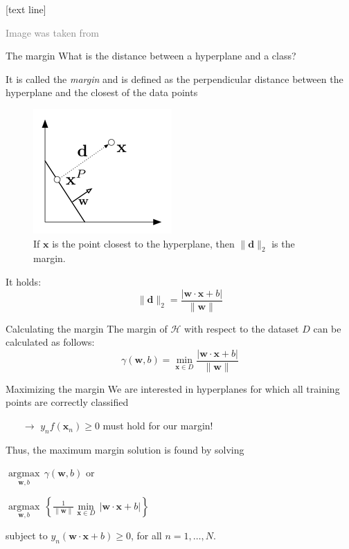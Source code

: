 \documentclass[dvipsnames]{beamer}
\DeclareMathOperator*{\argmax}{argmax}
\newcommand{\referencefootnote}[1]{\setbeamertemplate{footline}[text line]{%
\parbox{0.9\paperwidth}{\vspace*{-23pt}\tiny{\textcolor{gray}{#1}}\hfill\scriptsize\insertframenumber}}}
\begin{document}
{ \referencefootnote{Image was taken from \cite{deisenroth_faisal_ong_2020}}
    \begin{frame}{The margin}
				What is the distance between a hyperplane and a class?
				
				It is called the \emph{margin} and is defined as the perpendicular distance between the hyperplane and the closest of the data points
				\begin{figure}
					\center
					\includegraphics[scale=.6]{figures/margin6.png}
					\caption{If $\mathbf{x}$ is the point closest to the hyperplane, then $\|\mathbf{d}\|_2$ is the margin.}
        \end{figure} \pause
				It holds:
				\[
				\|\mathbf{d}\|_2 = \frac{|\mathbf{w} \cdot \mathbf{x} + b|}{\|\mathbf{w}\|}
				\]
    \end{frame}
		}
		
		 \begin{frame}{Calculating the margin}
				The margin of $\mathcal{H}$ with respect to the dataset $D$ can be calculated as follows:
				\[
						\gamma(\mathbf{w},b) = \min_{\mathbf{x}\in D}\frac{|\mathbf{w} \cdot \mathbf{x} + b|}{\|\mathbf{w}\|}
				\]
     \end{frame}
		
		
		\begin{frame}{Maximizing the margin}
			\pause
			We are interested in hyperplanes for which all training points are correctly classified \pause
			\begin{itemize}
				\item[$\rightarrow$] $y_{n} f(\mathbf{x}_n)\geq 0$ must hold for our margin! \pause
			\end{itemize}
			Thus, the maximum margin solution is found by solving
			
			 $\underset{\mathbf{w},b}{\argmax}\,\gamma(\mathbf{w},b) $ or \pause
			
			$\underset{\mathbf{w},b}{\argmax}\, \left\{\frac{1}{\|\mathbf{w}\|}\underset{\mathbf{x}\in D}{\min}\, |\mathbf{w} \cdot \mathbf{x} + b|\right\}$ \pause
			
			subject to $y_{n}(\mathbf{w} \cdot \mathbf{x} + b)\geq 0$, for all $n = 1, \dots,N$.
			
    \end{frame}
		
\end{document}
